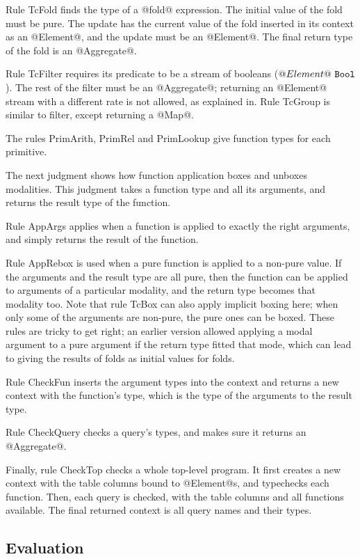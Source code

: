 Rule TcFold finds the type of a @fold@ expression.
The initial value of the fold must be pure.
The update has the current value of the fold inserted in its context as an @Element@, and the update must be an @Element@.
The final return type of the fold is an @Aggregate@.

Rule TcFilter requires its predicate to be a stream of booleans ($@Element@~\mathtt{Bool}$).
The rest of the filter must be an @Aggregate@; returning an @Element@ stream with a different rate is not allowed, as explained in.
Rule TcGroup is similar to filter, except returning a @Map@.

The rules PrimArith, PrimRel and PrimLookup give function types for each primitive.

The next judgment shows how function application boxes and unboxes modalities.
This judgment takes a function type and all its arguments, and returns the result type of the function.

Rule AppArgs applies when a function is applied to exactly the right arguments, and simply returns the result of the function.

Rule AppRebox is used when a pure function is applied to a non-pure value.
If the arguments and the result type are all pure, then the function can be applied to arguments of a particular modality, and the return type becomes that modality too.
Note that rule TcBox can also apply implicit boxing here; when only some of the arguments are non-pure, the pure ones can be boxed.
These rules are tricky to get right; an earlier version allowed applying a modal argument to a pure argument if the return type fitted that mode, which can lead to giving the results of folds as initial values for folds.



Rule CheckFun inserts the argument types into the context and returns a new context with the function's type, which is the type of the arguments to the result type.

Rule CheckQuery checks a query's types, and makes sure it returns an @Aggregate@.

Finally, rule CheckTop checks a whole top-level program.
It first creates a new context with the table columns bound to @Element@s, and typechecks each function.
Then, each query is checked, with the table columns and all functions available.
The final returned context is all query names and their types.


\subsection{Evaluation}

